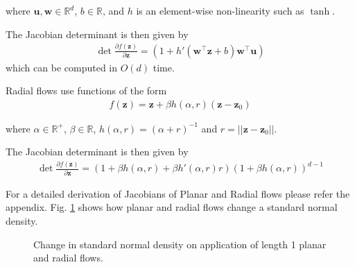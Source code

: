 \documentclass[runningheads]{llncs}
\begin{document}
where $\mathbf{u},\mathbf{w}\in \mathbb{R}^d$, $b \in \mathbb{R}$, and $h$ is an element-wise non-linearity such as $\tanh$.

The Jacobian determinant is then given by
\begin{align}
\det\frac{\partial f(\mathbf{z})}{\partial \mathbf{z}} =(1 + h'(\mathbf{w}^\top\mathbf{z} + b)\mathbf{w}^\top\mathbf{u})
\end{align}
which can be computed in $O(d)$ time.

Radial flows use functions of the form
\begin{align}
f(\mathbf{z}) = \mathbf{z} + \beta h(\alpha,r)(\mathbf{z}-\mathbf{z}_0)
\label{eq:radialfn}
\end{align}

where $\alpha \in \mathbb{R}^+$, $\beta \in \mathbb{R}$, $h(\alpha,r) = (\alpha + r)^{-1}$ and $r = \vert\vert\mathbf{z} - \mathbf{z}_0\vert\vert$.

The Jacobian determinant is then given by
\begin{align}
\det\frac{\partial f(\mathbf{z})}{\partial \mathbf{z}} = \left(1 + \beta h(\alpha,r) + \beta h'(\alpha,r)r\right)(1+\beta h(\alpha,r))^{d-1}
\end{align}

For a detailed derivation of Jacobians of Planar and Radial flows please refer the appendix. Fig. \ref{fig:planarradial} shows how planar and radial flows change a standard normal density.

\begin{figure}
	\centering
	\caption{Change in standard normal density on application of length 1 planar and radial flows.}
	\label{fig:planarradial}
\end{figure}
\end{document}
